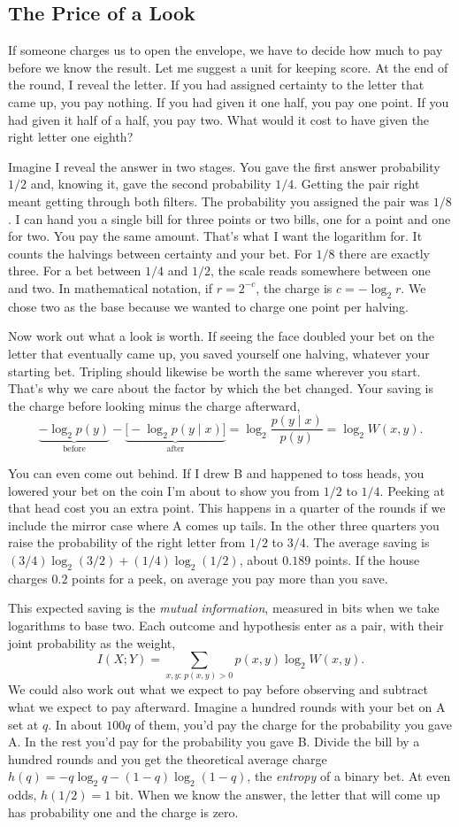 \documentclass[12pt,oneside]{article}
\newcommand{\secao}[1]{\Needspace{5.2\baselineskip}\subsection*{#1}}
\newcommand{\bookanchor}[1]{\phantomsection\label{#1}}
\begin{document}
\secao{The Price of a Look}
If\bookanchor{topic-02-1} someone charges us to open the envelope, we have to decide how much to pay before we know the result. Let me suggest a unit for keeping score. At the end of the round, I reveal the letter. If you had assigned certainty to the letter that came up, you pay nothing. If you had given it one half, you pay one point. If you had given it half of a half, you pay two. What would it cost to have given the right letter one eighth?

Imagine I reveal the answer in two stages. You gave the first answer probability $1/2$ and, knowing it, gave the second probability $1/4$. Getting the pair right meant getting through both filters. The probability you assigned the pair was $1/8$. I can hand you a single bill for three points or two bills, one for a point and one for two. You pay the same amount. That's what I want the logarithm for. It counts the halvings between certainty and your bet. For $1/8$ there are exactly three. For a bet between $1/4$ and $1/2$, the scale reads somewhere between one and two. In mathematical notation, if $r=2^{-c}$, the charge is $c=-\log_2 r$. We chose two as the base because we wanted to charge one point per halving.

Now work out what a look is worth. If seeing the face doubled your bet on the letter that eventually came up, you saved yourself one halving, whatever your starting bet. Tripling should likewise be worth the same wherever you start. That's why we care about the factor by which the bet changed. Your saving is the charge before looking minus the charge afterward,
\[
 \underbrace{-\log_2 p(y)}_{\text{before}}
 -\underbrace{\big[-\log_2 p(y\mid x)\big]}_{\text{after}}
 =\log_2\frac{p(y\mid x)}{p(y)}=\log_2 W(x,y).
\]

You can even come out behind. If I drew B and happened to toss heads, you lowered your bet on the coin I'm about to show you from $1/2$ to $1/4$. Peeking at that head cost you an extra point. This happens in a quarter of the rounds if we include the mirror case where A comes up tails. In the other three quarters you raise the probability of the right letter from $1/2$ to $3/4$. The average saving is $(3/4)\log_2(3/2)+(1/4)\log_2(1/2)$, about $0.189$ points. If the house charges $0.2$ points for a peek, on average you pay more than you save.

This\bookanchor{topic-02-2} expected saving is the \emph{mutual information}, measured in bits when we take logarithms to base two. Each outcome and hypothesis enter as a pair, with their joint probability as the weight,
\[
 I(X;Y)=\sum_{x,y:\,p(x,y)>0}p(x,y)\log_2 W(x,y).
\]
We\bookanchor{topic-02-4} could also work out what we expect to pay before observing and subtract what we expect to pay afterward. Imagine a hundred rounds with your bet on A set at $q$. In about $100q$ of them, you'd pay the charge for the probability you gave A. In the rest you'd pay for the probability you gave B. Divide the bill by a hundred rounds and you get the theoretical average charge $h(q)=-q\log_2 q-(1-q)\log_2(1-q)$, the \emph{entropy} of a binary bet. At even odds, $h(1/2)=1$ bit. When we know the answer, the letter that will come up has probability one and the charge is zero.
\end{document}

